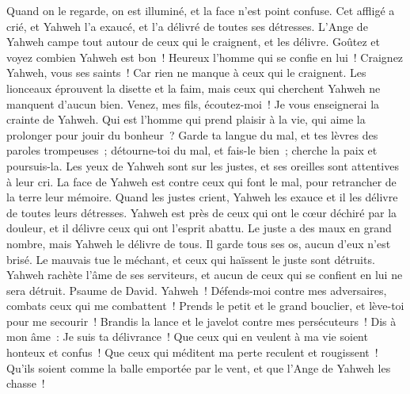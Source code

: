 \begin{multicols}{2}
 Quand on le regarde, on est illuminé, et la face n'est point confuse.
 Cet affligé a crié, et Yahweh l'a exaucé, et l'a délivré de toutes ses détresses.
 L'Ange de Yahweh campe tout autour de ceux qui le craignent, et les délivre.
 Goûtez et voyez combien Yahweh est bon~! Heureux l'homme qui se confie en lui~!
 Craignez Yahweh, vous ses saints~! Car rien ne manque à ceux qui le craignent.
 Les lionceaux éprouvent la disette et la faim, mais ceux qui cherchent Yahweh ne manquent d'aucun bien.
 Venez, mes fils, écoutez-moi~! Je vous enseignerai la crainte de Yahweh.
 Qui est l'homme qui prend plaisir à la vie, qui aime la prolonger pour jouir du bonheur~?
 Garde ta langue du mal, et tes lèvres des paroles trompeuses~;
 détourne-toi du mal, et fais-le bien~; cherche la paix et poursuis-la.
 Les yeux de Yahweh sont sur les justes, et ses oreilles sont attentives à leur cri.
 La face de Yahweh est contre ceux qui font le mal, pour retrancher de la terre leur mémoire.
 Quand les justes crient, Yahweh les exauce et il les délivre de toutes leurs détresses.
 Yahweh est près de ceux qui ont le cœur déchiré par la douleur, et il délivre ceux qui ont l'esprit abattu.
 Le juste a des maux en grand nombre, mais Yahweh le délivre de tous.
 Il garde tous ses os, aucun d'eux n'est brisé.
 Le mauvais tue le méchant, et ceux qui haïssent le juste sont détruits.
 Yahweh rachète l'âme de ses serviteurs, et aucun de ceux qui se confient en lui ne sera détruit.
\VerseOne{}Psaume de David. Yahweh~! Défends-moi contre mes adversaires, combats ceux qui me combattent~!
Prends le petit et le grand bouclier, et lève-toi pour me secourir~!
Brandis la lance et le javelot contre mes persécuteurs~! Dis à mon âme~: Je suis ta délivrance~!
Que ceux qui en veulent à ma vie soient honteux et confus~! Que ceux qui méditent ma perte reculent et rougissent~!
Qu'ils soient comme la balle emportée par le vent, et que l'Ange de Yahweh les chasse~!

\end{multicols}
